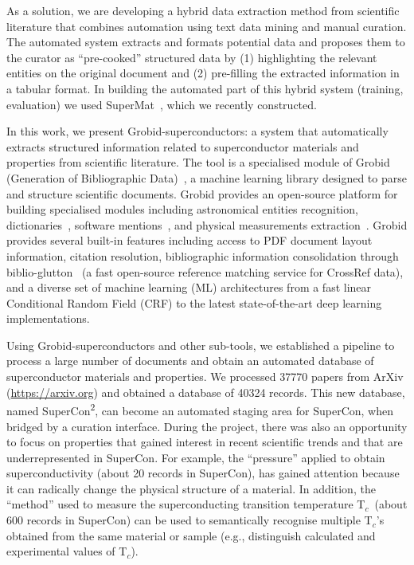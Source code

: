\documentclass[]{interact}
\theoremstyle{plain}%
\theoremstyle{definition}
\theoremstyle{remark}
\newcommand{\tc}{T$_{c}$}
\begin{document}
As a solution, we are developing a hybrid data extraction method from scientific literature that combines automation using text data mining and manual curation.
The automated system extracts and formats potential data and proposes them to the curator as ``pre-cooked'' structured data by (1) highlighting the relevant entities on the original document and (2) pre-filling the extracted information in a tabular format.
In building the automated part of this hybrid system (training, evaluation) we used SuperMat~\cite{foppiano2021supermat}, which we recently constructed.

In this work, we present Grobid-superconductors: a system that automatically extracts structured information related to superconductor materials and properties from scientific literature.
The tool is a specialised module of Grobid (Generation of Bibliographic Data)~\cite{GROBID}, a machine learning library designed to parse and structure scientific documents.
Grobid provides an open-source platform for building specialised modules including astronomical entities recognition\cite{grobid-astro}, dictionaries~\cite{khemakhem:hal-01508868}, software mentions~\cite{lopez2021mining}, and physical measurements extraction~\cite{foppiano2019quantities}.
Grobid provides several built-in features including access to PDF document layout information, citation resolution, bibliographic information consolidation through biblio-glutton~\cite{biblio-glutton-lookup} (a fast open-source reference matching service for CrossRef data), and a diverse set of machine learning (ML) architectures from a fast linear Conditional Random Field (CRF) to the latest state-of-the-art deep learning implementations.

Using Grobid-superconductors and other sub-tools, we established a pipeline to process a large number of documents and obtain an automated database of superconductor materials and properties.
We processed 37770 papers from ArXiv (\url{https://arxiv.org}) and obtained a database of 40324 records.
This new database, named SuperCon\textsuperscript{2}, can become an automated staging area for SuperCon, when bridged by a curation interface.
During the project, there was also an opportunity to focus on properties that gained interest in recent scientific trends and that are underrepresented in SuperCon.
For example, the ``pressure'' applied to obtain superconductivity (about 20 records in SuperCon), has gained attention because it can radically change the physical structure of a material.
In addition, the ``method'' used to measure the superconducting transition temperature \tc~(about 600 records in SuperCon) can be used to semantically recognise multiple \tc 's obtained from the same material or sample (e.g., distinguish calculated and experimental values of \tc).
\end{document}
